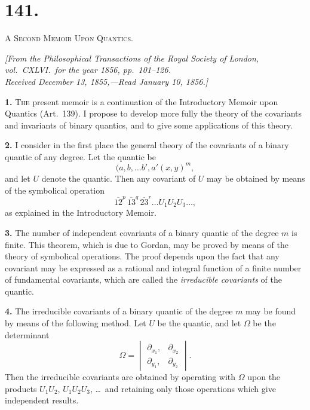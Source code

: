 \documentclass[11pt,a4paper]{book}
\begin{document}

\section*{141.}

\textsc{A Second Memoir Upon Quantics.}

\begin{flushright}
\textit{[From the Philosophical Transactions of the Royal Society of London,}\\
\textit{vol.\ CXLVI.\ for the year 1856, pp.\ 101--126.}\\
\textit{Received December 13, 1855,---Read January 10, 1856.]}
\end{flushright}

\textbf{1.} \textsc{The} present memoir is a continuation of the Introductory Memoir upon Quantics (Art.\ 139). I propose to develop more fully the theory of the covariants and invariants of binary quantics, and to give some applications of this theory.

\textbf{2.} I consider in the first place the general theory of the covariants of a binary quantic of any degree. Let the quantic be
\[
(a, b, \ldots b', a' \!\!\!\!\!(x, y)^m,
\]
and let $U$ denote the quantic. Then any covariant of $U$ may be obtained by means of the symbolical operation
\[
\overline{12}^p \, \overline{13}^q \, \overline{23}^r \ldots U_1 U_2 U_3 \ldots,
\]
as explained in the Introductory Memoir.

\newpage
\setcounter{page}{247}

\textbf{3.} The number of independent covariants of a binary quantic of the degree $m$ is finite. This theorem, which is due to Gordan, may be proved by means of the theory of symbolical operations. The proof depends upon the fact that any covariant may be expressed as a rational and integral function of a finite number of fundamental covariants, which are called the \textit{irreducible covariants} of the quantic.

\textbf{4.} The irreducible covariants of a binary quantic of the degree $m$ may be found by means of the following method. Let $U$ be the quantic, and let $\Omega$ be the determinant
\[
\Omega = \begin{vmatrix}
\partial_{x_1}, & \partial_{x_2} \\
\partial_{y_1}, & \partial_{y_2}
\end{vmatrix}.
\]
Then the irreducible covariants are obtained by operating with $\Omega$ upon the products $U_1 U_2$, $U_1 U_2 U_3$, \ldots\ and retaining only those operations which give independent results.
\end{document}

